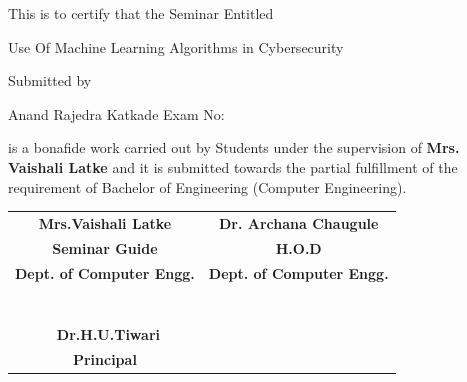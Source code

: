 \documentclass[oneside,a4paper,12pt]{report}
\begin{document}
\centerline{This is to certify that the Seminar Entitled}
\vspace*{1\baselineskip} 

{\bfseries \fontsize{14}{12} \selectfont \centerline{ Use Of Machine Learning Algorithms in Cybersecurity}
\vspace*{1\baselineskip}}

\centerline{\hspace{10 mm}Submitted by}
\vspace*{1\baselineskip} 
\begin{flushleft}
\hspace{10mm}Anand Rajedra Katkade \hspace{40mm} Exam No:
\end{flushleft}
\vspace*{1\baselineskip} 
is a bonafide work carried out by Students under the supervision of \textbf{ Mrs. Vaishali Latke} and it
is submitted towards the partial fulfillment of the requirement of Bachelor of Engineering (Computer Engineering).

\vspace*{3\baselineskip}
\bgroup
\def\arraystretch{0.7}
\begin{tabular}{c c}

\\ \textbf{Mrs.Vaishali Latke} &  \hspace{20 mm} \textbf{Dr. Archana Chaugule} \\								
\textbf{Seminar Guide}  &  \hspace{20 mm} \textbf{H.O.D} \\
\textbf{Dept. of Computer Engg.}  &	\hspace{20 mm}\textbf{Dept. of Computer Engg.}  \\
\\ \\ \\ \\ \\ \\ \\ \ \textbf{Dr.H.U.Tiwari}\\ 
 \textbf{Principal}
\end{tabular}
\egroup
\end{document}
